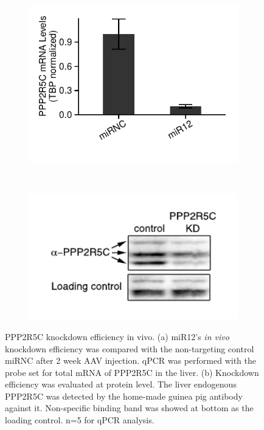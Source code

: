 \begin{figure}[htbp]
\centering
	\begin{subfigure}[t]{0.48\textwidth}
	\includegraphics[width=1\textwidth]{figs/fig2-20a pilot qPCR.pdf}
    \label{fig:fig2.20a}
	\end{subfigure} %
~
	\begin{subfigure}[t]{0.48\textwidth}
	\includegraphics[width=1\textwidth]{figs/fig2-20b kd in vivo protein.pdf}
    \label{fig:fig2.20b}
	\end{subfigure}
\caption[KD efficiency for miR12 \textit{in vivo}]{\footnotesize PPP2R5C knockdown efficiency in vivo. (a) miR12's \textit{in vivo} knockdown efficiency was compared with the non-targeting control miRNC after 2 week AAV injection. qPCR was performed with the probe set for total mRNA of PPP2R5C in the liver. (b) Knockdown efficiency was evaluated at protein level. The liver endogenous PPP2R5C was detected by the home-made guinea pig antibody against it. Non-specific binding band was showed at bottom as the loading control. n=5 for qPCR analysis.}
\label{fig:fig2.20}
\end{figure}

